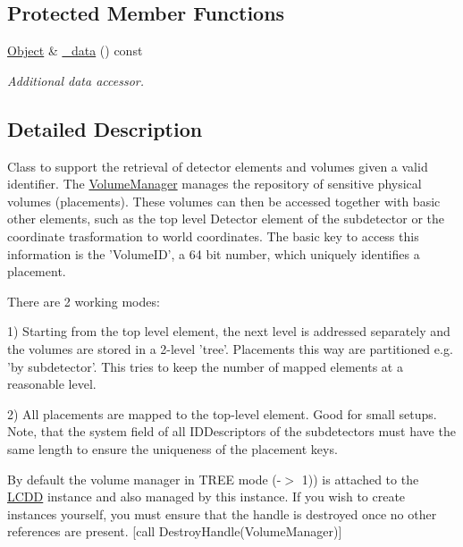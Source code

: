 \subsection*{Protected Member Functions}
\begin{DoxyCompactItemize}
\item 
\hyperlink{class_d_d4hep_1_1_geometry_1_1_volume_manager_object}{Object} \& \hyperlink{class_d_d4hep_1_1_geometry_1_1_volume_manager_ae450087aa8e00fdd9829e84c3638a4e7}{\_\-data} () const 
\begin{DoxyCompactList}\small\item\em Additional data accessor. \item\end{DoxyCompactList}\end{DoxyCompactItemize}


\subsection{Detailed Description}
Class to support the retrieval of detector elements and volumes given a valid identifier. The \hyperlink{class_d_d4hep_1_1_geometry_1_1_volume_manager}{VolumeManager} manages the repository of sensitive physical volumes (placements). These volumes can then be accessed together with basic other elements, such as the top level Detector element of the subdetector or the coordinate trasformation to world coordinates. The basic key to access this information is the 'VolumeID', a 64 bit number, which uniquely identifies a placement.

There are 2 working modes:

1) Starting from the top level element, the next level is addressed separately and the volumes are stored in a 2-\/level 'tree'. Placements this way are partitioned e.g. 'by subdetector'. This tries to keep the number of mapped elements at a reasonable level.

2) All placements are mapped to the top-\/level element. Good for small setups. Note, that the system field of all IDDescriptors of the subdetectors must have the same length to ensure the uniqueness of the placement keys.

By default the volume manager in TREE mode (-\/$>$ 1)) is attached to the \hyperlink{class_d_d4hep_1_1_geometry_1_1_l_c_d_d}{LCDD} instance and also managed by this instance. If you wish to create instances yourself, you must ensure that the handle is destroyed once no other references are present. \mbox{[}call DestroyHandle(VolumeManager)\mbox{]}

